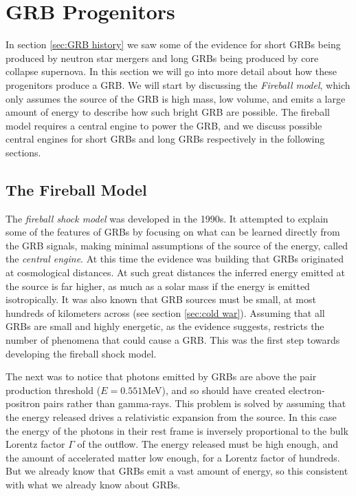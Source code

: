 \documentclass[11pt]{cuthesis}
\begin{document}
\section{GRB Progenitors}
In section \ref{sec:GRB history} we saw some of the evidence for short GRBs being produced by neutron star mergers and long GRBs being produced by core collapse supernova. In this section we will go into more detail about how these progenitors produce a GRB. We will start by discussing the \textit{Fireball model}, which only assumes the source of the GRB is high mass, low volume, and emits a large amount of energy to describe how such bright GRB are possible. The fireball model requires a central engine to power the GRB, and we discuss possible central engines for short GRBs and long GRBs respectively in the following sections.   


\subsection{The Fireball Model}
The \textit{fireball shock model} was developed in the 1990s. It attempted to explain some of the features of GRBs by focusing on what can be learned directly from the GRB signals, making minimal assumptions of the source of the energy, called the \textit{central engine}. At this time the evidence was building that GRBs originated at cosmological distances. At such great distances the inferred energy emitted at the source is far higher, as much as a solar mass if the energy is emitted isotropically. It was also known that GRB sources must be small, at most hundreds of kilometers across (see section \ref{sec:cold war}). Assuming that all GRBs are small and highly energetic, as the evidence suggests, restricts the number of phenomena that could cause a GRB. This was the first step towards developing the fireball shock model. 

The next was to notice that photons emitted by GRBs are above the pair production threshold ($E=0.551$MeV), and so should have created electron-positron pairs rather than gamma-rays. This problem is solved by assuming that the energy released drives a relativistic expansion from the source. In this case the energy of the photons in their rest frame is inversely proportional to the bulk Lorentz factor $\Gamma$ of the outflow. The energy released must be high enough, and the amount of accelerated matter low enough, for a Lorentz factor of hundreds. But we already know that GRBs emit a vast amount of energy, so this consistent with what we already know about GRBs. 
\end{document}
